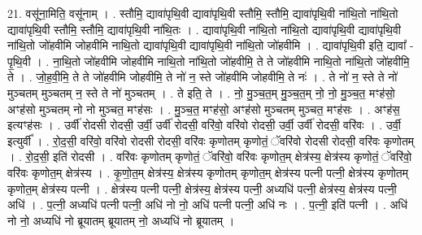\documentclass[17pt]{extarticle}
\begin{document}
21. वसू॑ना॒मिति॒ वसू॑नाम् । . स्तौमि॒ द्यावा॑पृथि॒वी द्यावा॑पृथि॒वी स्तौमि॒ स्तौमि॒ द्यावा॑पृथि॒वी ना॑थि॒तो ना॑थि॒तो द्यावा॑पृथि॒वी स्तौमि॒ स्तौमि॒ द्यावा॑पृथि॒वी ना॑थि॒तः । . द्यावा॑पृथि॒वी ना॑थि॒तो ना॑थि॒तो द्यावा॑पृथि॒वी द्यावा॑पृथि॒वी ना॑थि॒तो जो॑हवीमि जोहवीमि नाथि॒तो द्यावा॑पृथि॒वी द्यावा॑पृथि॒वी ना॑थि॒तो जो॑हवीमि । . द्यावा॑पृथि॒वी इति॒ द्यावा᳚ - पृ॒थि॒वी । . ना॒थि॒तो जो॑हवीमि जोहवीमि नाथि॒तो ना॑थि॒तो जो॑हवीमि॒ ते ते जो॑हवीमि नाथि॒तो ना॑थि॒तो जो॑हवीमि॒ ते । . जो॒ह॒वी॒मि॒ ते ते जो॑हवीमि जोहवीमि॒ ते नो॑ न॒ स्ते जो॑हवीमि जोहवीमि॒ ते नः॑ । . ते नो॑ न॒ स्ते ते नो॑ मुञ्चतम् मुञ्चतम् न॒ स्ते ते नो॑ मुञ्चतम् । . ते इति॒ ते । . नो॒ मु॒ञ्च॒त॒म् मु॒ञ्च॒त॒म् नो॒ नो॒ मु॒ञ्च॒त॒ मꣳह॑सो॒ अꣳह॑सो मुञ्चतम् नो नो मुञ्चत॒ 
मꣳह॑सः । . मु॒ञ्च॒त॒ मꣳह॑सो॒ अꣳह॑सो मुञ्चतम् मुञ्चत॒ मꣳह॑सः । . अꣳह॑स॒ इत्यꣳह॑सः । . उर्वी॑ रोदसी रोदसी॒ उर्वी॒ उर्वी॑ रोदसी॒ वरि॑वो॒ वरि॑वो रोदसी॒ उर्वी॒ उर्वी॑ रोदसी॒ वरि॑वः । . उर्वी॒ इत्युर्वी᳚ । . रो॒द॒सी॒ वरि॑वो॒ वरि॑वो रोदसी रोदसी॒ वरि॑वः कृणोतम् कृणोतं॒ ॅवरि॑वो रोदसी रोदसी॒ वरि॑वः कृणोतम् । . रो॒द॒सी॒ इति॑ रोदसी । . वरि॑वः कृणोतम् कृणोतं॒ ॅवरि॑वो॒ वरि॑वः कृणोत॒म् क्षेत्र॑स्य॒ क्षेत्र॑स्य कृणोतं॒ ॅवरि॑वो॒ वरि॑वः कृणोत॒म् क्षेत्र॑स्य । . कृ॒णो॒त॒म् क्षेत्र॑स्य॒ क्षेत्र॑स्य कृणोतम् कृणोत॒म् क्षेत्र॑स्य पत्नी पत्नी॒ क्षेत्र॑स्य कृणोतम् कृणोत॒म् क्षेत्र॑स्य पत्नी । . क्षेत्र॑स्य पत्नी पत्नी॒ क्षेत्र॑स्य॒ क्षेत्र॑स्य पत्नी॒ अध्यधि॑ पत्नी॒ क्षेत्र॑स्य॒ क्षेत्र॑स्य पत्नी॒ अधि॑ । . प॒त्नी॒ अध्यधि॑ पत्नी पत्नी॒ अधि॑ नो नो॒ अधि॑ पत्नी पत्नी॒ अधि॑ नः । . प॒त्नी॒ इति॑ पत्नी । . अधि॑ नो नो॒ अध्यधि॑ नो ब्रूयातम् ब्रूयातम् नो॒ अध्यधि॑ नो ब्रूयातम् । \newline
\end{document}
